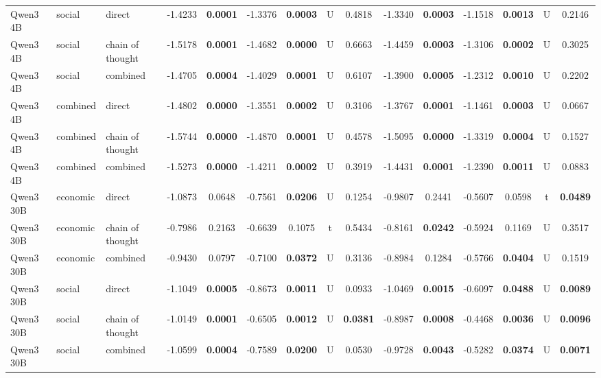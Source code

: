 \begin{center}
\begin{longtable}{@{}lll|cccccc|cccccc@{}}
        Qwen3 4B & social & direct & -1.4233 & \textbf{0.0001} & -1.3376 & \textbf{0.0003} & U & 0.4818 & -1.3340 & \textbf{0.0003} & -1.1518 & \textbf{0.0013} & U & 0.2146 \\
        Qwen3 4B & social & chain of thought & -1.5178 & \textbf{0.0001} & -1.4682 & \textbf{0.0000} & U & 0.6663 & -1.4459 & \textbf{0.0003} & -1.3106 & \textbf{0.0002} & U & 0.3025 \\
        Qwen3 4B & social & combined & -1.4705 & \textbf{0.0004} & -1.4029 & \textbf{0.0001} & U & 0.6107 & -1.3900 & \textbf{0.0005} & -1.2312 & \textbf{0.0010} & U & 0.2202 \\
        Qwen3 4B & combined & direct & -1.4802 & \textbf{0.0000} & -1.3551 & \textbf{0.0002} & U & 0.3106 & -1.3767 & \textbf{0.0001} & -1.1461 & \textbf{0.0003} & U & 0.0667 \\
        Qwen3 4B & combined & chain of thought & -1.5744 & \textbf{0.0000} & -1.4870 & \textbf{0.0001} & U & 0.4578 & -1.5095 & \textbf{0.0000} & -1.3319 & \textbf{0.0004} & U & 0.1527 \\
        \rowcolor{gray!20} Qwen3 4B & combined & combined & -1.5273 & \textbf{0.0000} & -1.4211 & \textbf{0.0002} & U & 0.3919 & -1.4431 & \textbf{0.0001} & -1.2390 & \textbf{0.0011} & U & 0.0883 \\
        Qwen3 30B & economic & direct & -1.0873 & 0.0648 & -0.7561 & \textbf{0.0206} & U & 0.1254 & -0.9807 & 0.2441 & -0.5607 & 0.0598 & t & \textbf{0.0489} \\
        Qwen3 30B & economic & chain of thought & -0.7986 & 0.2163 & -0.6639 & 0.1075 & t & 0.5434 & -0.8161 & \textbf{0.0242} & -0.5924 & 0.1169 & U & 0.3517 \\
        Qwen3 30B & economic & combined & -0.9430 & 0.0797 & -0.7100 & \textbf{0.0372} & U & 0.3136 & -0.8984 & 0.1284 & -0.5766 & \textbf{0.0404} & U & 0.1519 \\
        Qwen3 30B & social & direct & -1.1049 & \textbf{0.0005} & -0.8673 & \textbf{0.0011} & U & 0.0933 & -1.0469 & \textbf{0.0015} & -0.6097 & \textbf{0.0488} & U & \textbf{0.0089} \\
        Qwen3 30B & social & chain of thought & -1.0149 & \textbf{0.0001} & -0.6505 & \textbf{0.0012} & U & \textbf{0.0381} & -0.8987 & \textbf{0.0008} & -0.4468 & \textbf{0.0036} & U & \textbf{0.0096} \\
        Qwen3 30B & social & combined & -1.0599 & \textbf{0.0004} & -0.7589 & \textbf{0.0200} & U & 0.0530 & -0.9728 & \textbf{0.0043} & -0.5282 & \textbf{0.0374} & U & \textbf{0.0071} \\

\end{longtable}
\end{center}
